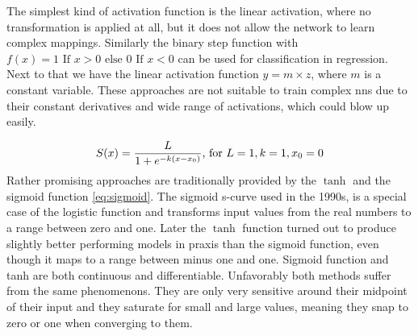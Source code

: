 The simplest kind of activation function is the linear activation, where no transformation is applied at all, but it does not allow the network to learn complex mappings. Similarly the binary step function with \( f(x)=1 \text { If } x>0 \text { else } 0 \text { If } x<0 \) can be used for classification in \gls{regression}. Next to that we have the linear activation function \( y = m \times z \), where \( m \) is a constant variable. These approaches are not suitable to train complex \acrshort{nn}s due to their constant derivatives and wide range of activations, which could blow up easily.

\begin{equation}
S(x)=\frac{L}{1+e^{-k(x-x_0)}} \textnormal{, for } L=1, k=1, x_0=0
\label{eq:sigmoid}
\end{equation}
Rather promising approaches are traditionally provided by the \( \tanh \) and the sigmoid function \cref{eq:sigmoid}. The sigmoid s-curve used in the 1990s, is a special case of the logistic function and transforms input values from the real numbers to a range between zero and one. Later the \( \tanh \) function turned out to produce slightly better performing models in praxis than the sigmoid function, even though it maps to a range between minus one and one. Sigmoid function and tanh are both continuous and differentiable. Unfavorably both methods suffer from the same phenomenons. They are only very sensitive around their midpoint of their input and they saturate for small and large values, meaning they snap to zero or one when converging to them. \cite{Goodfellow.2016}

